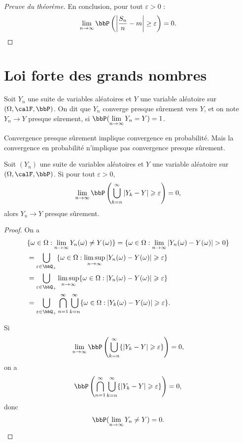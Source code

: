 \begin{proof}[Preuve du théorème]
    En conclusion, pour tout $\varepsilon > 0$ :
    \[ \lim_{n \to \infty} \bbP\left(\left| \frac{S_n}{n} - m \right| \ge \varepsilon \right) = 0. \]

\end{proof}

\section{Loi forte des grands nombres}

\begin{deff}
    Soit $Y_n$ une suite de variables aléatoires et $Y$ une variable aléatoire sur $(\Omega, \calF, \bbP)$.
    On dit que $Y_n$ converge presque sûrement vers $Y$, et on note $Y_n \to Y$ presque sûrement,
    si $\bbP(\lim\limits_{n \to \infty} Y_n = Y) = 1$.
\end{deff}

\begin{rqq}
    Convergence presque sûrement implique convergence en probabilité.
    Mais la convergence en probabilité n'implique pas convergence presque sûrement.
\end{rqq}

\begin{prop}
    Soit $(Y_n)$ une suite de variables aléatoires et $Y$ une variable aléatoire sur $(\Omega, \calF, \bbP)$.
    Si pour tout $\varepsilon > 0$,
    \[ \lim_{n \to \infty} \bbP \left(\bigcup_{k = n}^\infty \lrvert{Y_k - Y} \geqslant \varepsilon\right) = 0, \]
    alors $Y_n \to Y$ presque sûrement.
\end{prop}

\begin{proof}
    On a
    \begin{align*}
         & \{ \omega \in \Omega: \lim_{n \to \infty} Y_n(\omega) \neq Y(\omega) \}
        = \{ \omega \in \Omega: \lim_{n \to \infty} \lrvert{Y_n(\omega) - Y(\omega)} > 0 \}                                 \\
         & = \bigcup_{\varepsilon \in \bbQ_+} \{ \omega \in \Omega: \limsup_{n \to \infty} \lrvert{Y_n(\omega) - Y(\omega)}
        \geqslant \varepsilon \}                                                                                            \\
         & = \bigcup_{\varepsilon \in \bbQ_+} \limsup_{n \to \infty} \{ \omega \in \Omega: \lrvert{Y_n(\omega) - Y(\omega)}
        \geqslant \varepsilon \}                                                                                            \\
         & = \bigcup_{\varepsilon \in \bbQ_+} \bigcap_{n = 1}^\infty \bigcup_{k = n}^\infty
        \{ \omega \in \Omega: \lrvert{Y_k(\omega) - Y(\omega)} \geqslant \varepsilon \}.
    \end{align*}

    Si
    \[ \lim\limits_{n \to \infty} \bbP \left(\bigcup_{k = n}^\infty \{ \lrvert{Y_k - Y} \geqslant \varepsilon \}\right) = 0, \]
    on a
    \[ \bbP \left(\bigcap_{n = 1}^\infty \bigcup_{k = n}^\infty
        \{\lrvert{Y_k - Y} \geqslant \varepsilon \}\right) = 0, \]
    donc
    \[ \bbP(\lim_{n \to \infty} Y_n \neq Y) = 0. \]
\end{proof}

